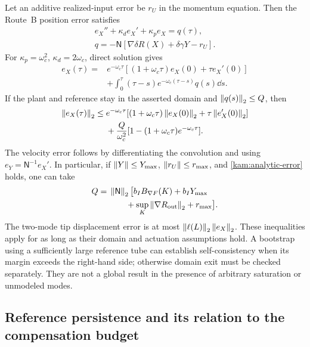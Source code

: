 Let an additive realized-input error be $r_U$ in the momentum equation. Then the Route~B position error satisfies
\[
\begin{gathered}
 e_X''+\kappa_de_X'+\kappa_pe_X=q(\tau),\\
 q=-\mathsf N[\nabla\delta R(X)+\delta\gamma Y-r_U].
\end{gathered}
\]
For $\kappa_p=\omega_c^2$, $\kappa_d=2\omega_c$, direct solution gives
\begin{equation}\label{ss:tracking-convolution}
\begin{aligned}
 e_X(\tau)={}&e^{-\omega_c\tau}
       [(1+\omega_c\tau)e_X(0)+\tau e_X'(0)]\\
 &+\int_0^\tau(\tau-s)e^{-\omega_c(\tau-s)}q(s)\dd s.
\end{aligned}
\end{equation}
If the plant and reference stay in the asserted domain and $\left\lVert q(s)\right\rVert_2\le Q$, then
\begin{equation}\label{ss:tracking-bound}
\begin{aligned}
 \left\lVert e_X(\tau)\right\rVert_2\le{}&e^{-\omega_c\tau}
  [(1+\omega_c\tau)\left\lVert e_X(0)\right\rVert_2+\tau\left\lVert e_X'(0)\right\rVert_2]\\
 &+\frac{Q}{\omega_c^2}
       [1-(1+\omega_c\tau)e^{-\omega_c\tau}].
\end{aligned}
\end{equation}
The velocity error follows by differentiating the convolution and using $e_Y=\mathsf N^{-1}e_X'$. In particular, if $\left\lVert Y\right\rVert\le Y_{\max}$, $\left\lVert r_U\right\rVert\le r_{\max}$, and \eqref{kam:analytic-error} holds, one can take
\[
\begin{aligned}
 Q={}&\left\lVert\mathsf N\right\rVert_2\bigl[b_I B_{\nabla F}(K)+b_I Y_{\max}\\
     &\qquad+\sup_K\left\lVert\nabla R_{\rm out}\right\rVert_2+r_{\max}\bigr].
\end{aligned}
\]
The two-mode tip displacement error is at most
$\left\lVert\ell(L)\right\rVert_2\left\lVert e_X\right\rVert_2$.
These inequalities apply for as long as their domain and actuation assumptions hold. A bootstrap using a sufficiently large reference tube can establish self-consistency when its margin exceeds the right-hand side; otherwise domain exit must be checked separately. They are not a global result in the presence of arbitrary saturation or unmodeled modes.


\subsection{Reference persistence and its relation to the compensation budget}
\label{kam:budgets-section}

